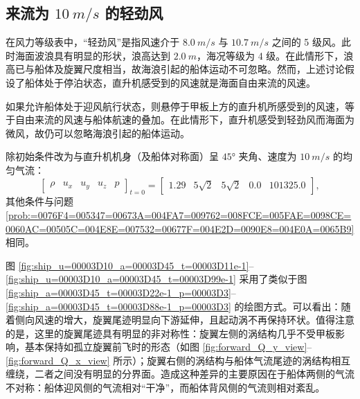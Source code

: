 \subsection{来流为 $\SI{10}{m/s}$ 的轻劲风}

在风力等级表中，“轻劲风”是指风速介于 $\SI{8.0}{m/s}$ 与 $\SI{10.7}{m/s}$ 之间的 5 级风。此时海面波浪具有明显的形状，浪高达到
$\SI{2.0}{m}$，海况等级为 4 级。在此情形下，浪高已与船体及旋翼尺度相当，故海浪引起的船体运动不可忽略。然而，上述讨论假设了船体处于停泊状态，直升机感受到的风速就是海面自由来流的风速。

如果允许船体处于迎风航行状态，则悬停于甲板上方的直升机所感受到的风速，等于自由来流的风速与船体航速的叠加。在此情形下，直升机感受到轻劲风而海面为微风，故仍可以忽略海浪引起的船体运动。
\begin{problem}
[直升机侧面迎轻劲风悬停于甲板中部上方]\label{prob:=0076F4=005347=00673A=004FA7=009762=008FCE=008F7B=0052B2=0098CE=0060AC=00505C=004E8E=007532=00677F=004E2D=0090E8=004E0A=0065B9}除初始条件改为与直升机机身（及船体对称面）呈
$\ang{45}$ 夹角、速度为 $\SI{10}{m/s}$ 的均匀气流：
\begin{equation}
\begin{bmatrix}\rho & u_{x} & u_{y} & u_{z} & p\end{bmatrix}_{t=0}=\begin{bmatrix}1.29 & 5\sqrt{2} & 5\sqrt{2} & 0.0 & 101325.0\end{bmatrix},
\end{equation}
其他条件与问题 \ref{prob:=0076F4=005347=00673A=004FA7=009762=008FCE=005FAE=0098CE=0060AC=00505C=004E8E=007532=00677F=004E2D=0090E8=004E0A=0065B9}
相同。
\end{problem}

图 \ref{fig:ship_u=00003D10_a=00003D45_t=00003D11e-1}–\ref{fig:ship_u=00003D10_a=00003D45_t=00003D99e-1}
采用了类似于图 \ref{fig:ship_a=00003D45_t=00003D22e-1_p=00003D3}–\ref{fig:ship_a=00003D45_t=00003D88e-1_p=00003D3}
的绘图方式。可以看出：随着侧向风速的增大，旋翼尾迹明显向下游延伸，且起动涡不再保持环状。值得注意的是，这里的旋翼尾迹具有明显的非对称性：旋翼左侧的涡结构几乎不受甲板影响，基本保持如孤立旋翼前飞时的形态（如图
\ref{fig:forward_Q_y_view}–\ref{fig:forward_Q_x_view} 所示）；旋翼右侧的涡结构与船体气流尾迹的涡结构相互缠绕，二者之间没有明显的分界面。造成这种差异的主要原因在于船体两侧的气流不对称：船体迎风侧的气流相对“干净”，而船体背风侧的气流则相对紊乱。


